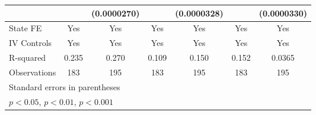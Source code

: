 {\begin{tabular}{l*{6}{c}}
                    &                     & (0.0000270)         &                     & (0.0000328)         &                     & (0.0000330)         \\
\midrule
State FE            &         Yes         &         Yes         &         Yes         &         Yes         &         Yes         &         Yes         \\
IV Controls         &         Yes         &         Yes         &         Yes         &         Yes         &         Yes         &         Yes         \\
R-squared           &       0.235         &       0.270         &       0.109         &       0.150         &       0.152         &      0.0365         \\
Observations        &         183         &         195         &         183         &         195         &         183         &         195         \\
\bottomrule
\multicolumn{7}{l}{\footnotesize Standard errors in parentheses}\\
\multicolumn{7}{l}{\footnotesize \sym{*} \(p<0.05\), \sym{**} \(p<0.01\), \sym{***} \(p<0.001\)}\\
\end{tabular}
}
